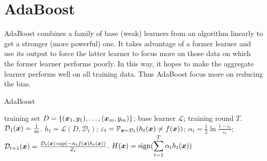 \section{AdaBoost}
AdaBoost combines a family of base (weak) learners from an algorithm linearly to get a stronger (more
powerful) one. It takes advantage
of a former learner and use its output to force the latter learner to focus more on those data on which the
former learner performs poorly. In this way, it hopes to make the aggregate learner performs well on all
training data. Thus AdaBoost focus more on reducing the bias. 
\begin{algorithm}
    \caption{AdaBoost}\label{AdaBoost}
    \begin{algorithmic}[1]
        \Require training set $D = \{(\boldsymbol{x}_1, y_1), \ldots, (\boldsymbol{x}_m, y_m)\}$; base learner $\mathcal{L}$;
        training round $T$.
        \State $\mathcal{D}_1(\boldsymbol{x}) = \frac{1}{m}$.
            \State $h_t = \mathcal{L}(D, \mathcal{D}_t)$;
            \State $\varepsilon_t = \operatorname*{\mathbb{P}}_{\boldsymbol{x}\sim\mathcal{D}_t}(h_t(\boldsymbol{x})\neq f(\boldsymbol{x}))$;
            \State $\alpha_t = \frac{1}{2}\ln{\frac{1 - \varepsilon_t}{\varepsilon_t}}$;\label{AdaBoost_alphat}
            \State $\mathcal{D}_{t + 1}(\boldsymbol{x}) = \frac{\mathcal{D}_t(\boldsymbol{x})\exp(-\alpha_t f(\boldsymbol{x})h_t(\boldsymbol{x}))}
            {Z_t}$.\label{AdaBoost_distritution}
        \EndFor
        \Ensure $H(\boldsymbol{x}) = \operatorname{sign}(\displaystyle\sum_{t = 1}^T \alpha_t h_t(\boldsymbol{x}))$
    \end{algorithmic}
\end{algorithm}

